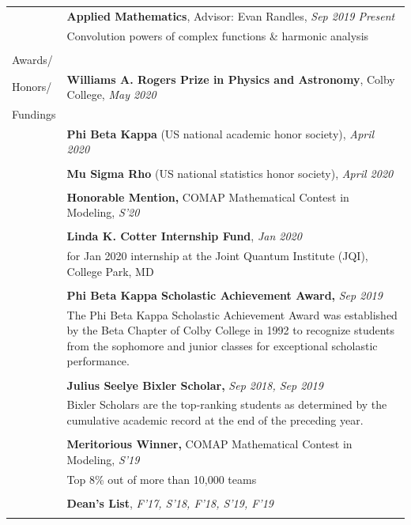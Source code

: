 \documentclass[10pt]{article}
\begin{document}
\begin{longtable}{ l m{14.5cm}   }
	& \textbf{Applied Mathematics}, Advisor: Evan Randles, \textit{Sep 2019 \textendash Present}\\
	& Convolution powers of complex functions \& harmonic analysis\\
	& \\
     					
     					



\large{Awards/}    	& \\
\large{Honors/}		& \textbf{Williams A. Rogers Prize in Physics and Astronomy}, Colby College, \textit{May 2020} \\
\large{Fundings}	& \\
& \textbf{Phi Beta Kappa} (US national academic honor society), \textit{April 2020} \\
& \\
& \textbf{Mu Sigma Rho} (US national statistics honor society), \textit{April 2020}\\
&\\
& \textbf{Honorable Mention,}  COMAP Mathematical Contest in Modeling, \textit{S'20}\\
&\\
& \textbf{Linda K. Cotter Internship Fund}, \textit{Jan 2020}\\
& for Jan 2020 internship at the Joint Quantum Institute (JQI), College Park, MD\\
&\\
& \textbf{Phi Beta Kappa Scholastic Achievement Award,} \textit{Sep 2019}\\
& The Phi Beta Kappa Scholastic Achievement Award was established by the Beta Chapter of Colby College in 1992 to recognize students from the sophomore and junior classes for exceptional scholastic performance.\\
&\\
& \textbf{Julius Seelye Bixler Scholar,} \textit{Sep 2018, Sep 2019}\\
& Bixler Scholars are the top-ranking students as determined by the cumulative academic record at the end of the preceding year.\\
&\\
& \textbf{Meritorious Winner,}  COMAP Mathematical Contest in Modeling, \textit{S'19}\\
& Top 8\% out of more than 10,000 teams\\
&\\
& \textbf{Dean’s List}, \textit{F'17, S'18, F'18, S'19, F'19}\\
&\\
		

\end{longtable}
\end{document}

